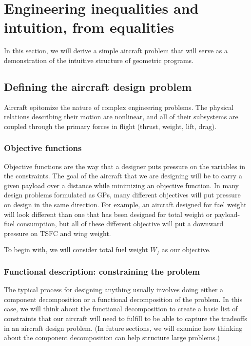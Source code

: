 \chapter{Engineering inequalities and intuition, from equalities}

In this section, we will derive a simple aircraft problem that will serve as 
a demonstration of the intuitive structure of geometric programs. 

\section{Defining the aircraft design problem}

Aircraft epitomize the nature of complex engineering problems. The physical 
relations describing their motion are nonlinear, and all of their subsystems are 
coupled through the primary forces in flight (thrust, weight, lift, drag). 

\subsection{Objective functions}

Objective functions are the way that a designer puts pressure on the variables 
in the constraints. The goal of the aircraft that we are designing will be to carry a given payload
over a distance while minimizing an objective function. In many design problems
formulated as \gls{GP}s, many different objectives will put pressure on design 
in the same direction. For example, an aircraft designed for fuel weight will look different than one
that has been designed for total weight or payload-fuel consumption, but all of
these different objective will put a downward pressure on TSFC and wing weight. 

To begin with, we will consider total fuel weight $W_f$ as our objective.

\subsection{Functional description: constraining the problem}

The typical process for designing anything usually involves doing either a
component decomposition or a functional decomposition of the problem. In
this case, we will think about the functional decomposition to create a
basic list of constraints that our aircraft will need to fulfill to be
able to capture the tradeoffs in an aircraft design problem. (In future
sections, we will examine how thinking about the component decomposition
can help structure large problems.)

